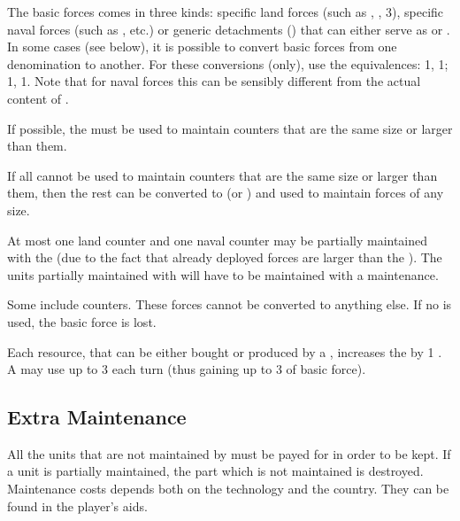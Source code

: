 \aparag The basic forces comes in three kinds: specific land forces (such as
\ARMY\faceplus, \ARMY\facemoins, 3\LD), specific naval forces (such as
\FLEET\faceplus, etc.) or generic detachments (\GD) that can either serve as
\LD or \ND.
\bparag In some cases (see below), it is possible to convert basic forces from
one denomination to another. For these conversions (only), use the
equivalences: 1\ARMY{}\LD, 1\ARMY{}\ARMY{}\LD ;
1\FLEET{}\ND, 1\FLEET{}\FLEET{}\ND. Note that for
naval forces this can be sensibly different from the actual content of \FLEET.

\aparag If possible, the  must be used to maintain
counters that are the same size or larger than them.

\aparag If all  cannot be used to maintain counters that
are the same size or larger than them, then the rest can be converted to \LD
(or \ND) and used to maintain forces of any size.

\aparag At most one land counter and one naval counter may be partially
maintained with the  (due to the fact that already
deployed forces are larger than the ).
\bparag The units partially maintained with  will have to
be maintained with a  maintenance.

\aparag Some  include \corsaire counters. These forces
cannot be converted to anything else. If no \corsaire is used, the basic force
is lost.

\label{chExpenses:Effect of Wood Maintenance} Each
 resource, that can be either bought or produced by a \MAJ,
increases the  by 1 \ND.
\bparag A \MAJ may use up to 3  each turn (thus gaining up to 3\ND
of basic force).



\subsection{Extra Maintenance}

\aparag All the units that are not maintained by  must be
payed for in order to be kept.
\bparag If a unit is partially maintained, the part which is not maintained is
destroyed.
\bparag Maintenance costs depends both on the technology and the country. They
can be found in the player's aids.

